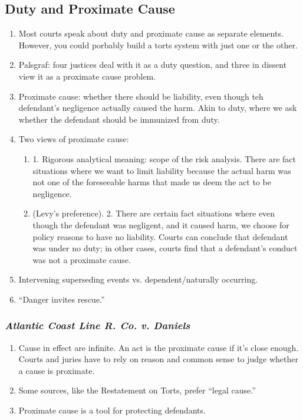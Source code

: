 \subsection{Duty and Proximate Cause}

\begin{enumerate}
    \item Most courts speak about duty and proximate cause as separate 
    elements. However, you could porbably build a torts system with just one 
    or the other.
    \item Palsgraf: four justices deal with it as a duty question, and three 
    in dissent view it as a proximate cause problem.
    \item Proximate cause: whether there should be liability, even though teh 
    defendant's negligence actually caused the harm. Akin to duty, where we 
    ask whether the defendant should be immunized from duty.
    \item Two views of proximate cause:
    \begin{enumerate}
        \item 1. Rigorous analytical meaning: scope of the risk analysis. 
        There are fact situations where we want to limit liability because the 
        actual harm was not one of the foreseeable harms that made us deem the 
        act to be negligence.  \item (Levy's preference). 2. There are certain 
        fact situations where even though the defendant was negligent, and it 
        caused harm, we choose for policy reasons to have no liability. Courts 
        can conclude that defendant was under no duty; in other cases, courts 
        find that a defendant's conduct was not a proximate cause.
    \end{enumerate}
    \item Intervening superseding events vs. dependent/naturally occurring.
    \item ``Danger invites rescue.''
\end{enumerate}

\subsubsection{\emph{Atlantic Coast Line R. Co. v. Daniels}}

\begin{enumerate}
    \item Cause in effect are infinite. An act is the proximate cause if it's 
    close enough. Courts and juries have to rely on reason and common sense to 
    judge whether a cause is proximate.
    \item Some sources, like the Restatement on Torts, prefer ``legal cause.''
    \item Proximate cause is a tool for protecting defendants.
\end{enumerate}

